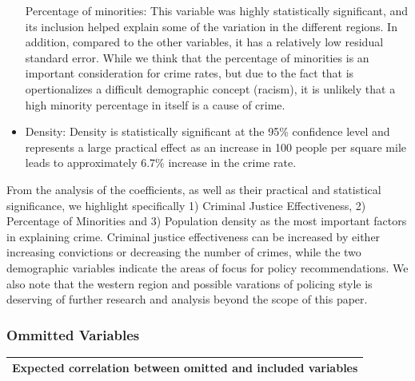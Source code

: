 \documentclass[]{article}
\begin{document}
\begin{itemize}
  Percentage of minorities: This variable was highly statistically
  significant, and its inclusion helped explain some of the variation in
  the different regions. In addition, compared to the other variables,
  it has a relatively low residual standard error. While we think that
  the percentage of minorities is an important consideration for crime
  rates, but due to the fact that is opertionalizes a difficult
  demographic concept (racism), it is unlikely that a high minority
  percentage in itself is a cause of crime.\\
\item
  Density: Density is statistically significant at the 95\% confidence
  level and represents a large practical effect as an increase in 100
  people per square mile leads to approximately 6.7\% increase in the
  crime rate.
\end{itemize}

From the analysis of the coefficients, as well as their practical and
statistical significance, we highlight specifically 1) Criminal Justice
Effectiveness, 2) Percentage of Minorities and 3) Population density as
the most important factors in explaining crime. Criminal justice
effectiveness can be increased by either increasing convictions or
decreasing the number of crimes, while the two demographic variables
indicate the areas of focus for policy recommendations. We also note
that the western region and possible varations of policing style is
deserving of further research and analysis beyond the scope of this
paper.

\hypertarget{ommitted-variables}{%
\subsubsection{Ommitted Variables}\label{ommitted-variables}}

\begin{longtable}[]{@{}l@{}}
\toprule
Expected correlation between omitted and included
variables\tabularnewline
\midrule
\endhead
\bottomrule
\end{longtable}
\end{document}
